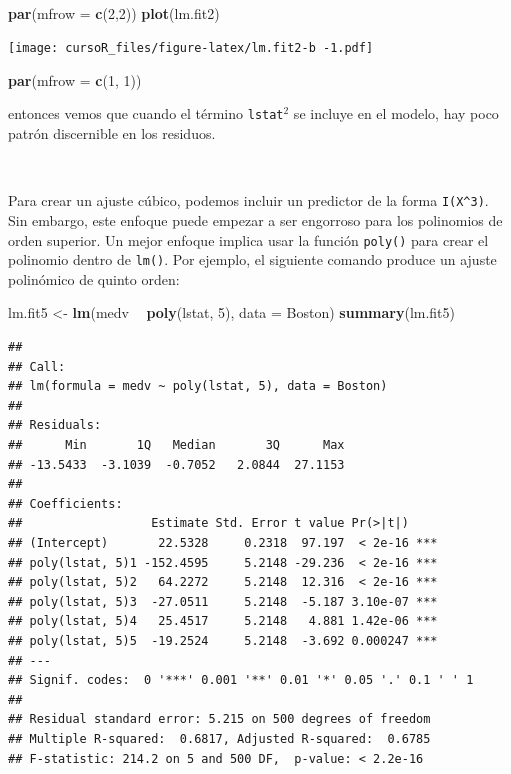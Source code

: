 \documentclass[]{book}
\newenvironment{Shaded}{\begin{snugshade}}{\end{snugshade}}
\newcommand{\KeywordTok}[1]{\textcolor[rgb]{0.13,0.29,0.53}{\textbf{#1}}}
\newcommand{\DataTypeTok}[1]{\textcolor[rgb]{0.13,0.29,0.53}{#1}}
\newcommand{\DecValTok}[1]{\textcolor[rgb]{0.00,0.00,0.81}{#1}}
\newcommand{\StringTok}[1]{\textcolor[rgb]{0.31,0.60,0.02}{#1}}
\newcommand{\OperatorTok}[1]{\textcolor[rgb]{0.81,0.36,0.00}{\textbf{#1}}}
\newcommand{\NormalTok}[1]{#1}
\begin{document}
~

\begin{Shaded}
\begin{Highlighting}[]
\KeywordTok{par}\NormalTok{(}\DataTypeTok{mfrow =} \KeywordTok{c}\NormalTok{(}\DecValTok{2}\NormalTok{,}\DecValTok{2}\NormalTok{))}
\KeywordTok{plot}\NormalTok{(lm.fit2)}
\end{Highlighting}
\end{Shaded}

\texttt{[image: cursoR\_files/figure-latex/lm.fit2-b -1.pdf]}

\begin{Shaded}
\begin{Highlighting}[]
\KeywordTok{par}\NormalTok{(}\DataTypeTok{mfrow =} \KeywordTok{c}\NormalTok{(}\DecValTok{1}\NormalTok{, }\DecValTok{1}\NormalTok{))}
\end{Highlighting}
\end{Shaded}

entonces vemos que cuando el término \texttt{lstat}\(^2\) se incluye en
el modelo, hay poco patrón discernible en los residuos.

~

Para crear un ajuste cúbico, podemos incluir un predictor de la forma
\texttt{I(X\^{}3)}. Sin embargo, este enfoque puede empezar a ser
engorroso para los polinomios de orden superior. Un mejor enfoque
implica usar la función \texttt{poly()} para crear el polinomio dentro
de \texttt{lm()}. Por ejemplo, el siguiente comando produce un ajuste
polinómico de quinto orden:

\begin{Shaded}
\begin{Highlighting}[]
\NormalTok{lm.fit5 <-}\StringTok{ }\KeywordTok{lm}\NormalTok{(medv }\OperatorTok{~}\StringTok{ }\KeywordTok{poly}\NormalTok{(lstat, }\DecValTok{5}\NormalTok{), }\DataTypeTok{data =}\NormalTok{ Boston)}
\KeywordTok{summary}\NormalTok{(lm.fit5)}
\end{Highlighting}
\end{Shaded}

\begin{verbatim}
## 
## Call:
## lm(formula = medv ~ poly(lstat, 5), data = Boston)
## 
## Residuals:
##      Min       1Q   Median       3Q      Max 
## -13.5433  -3.1039  -0.7052   2.0844  27.1153 
## 
## Coefficients:
##                  Estimate Std. Error t value Pr(>|t|)    
## (Intercept)       22.5328     0.2318  97.197  < 2e-16 ***
## poly(lstat, 5)1 -152.4595     5.2148 -29.236  < 2e-16 ***
## poly(lstat, 5)2   64.2272     5.2148  12.316  < 2e-16 ***
## poly(lstat, 5)3  -27.0511     5.2148  -5.187 3.10e-07 ***
## poly(lstat, 5)4   25.4517     5.2148   4.881 1.42e-06 ***
## poly(lstat, 5)5  -19.2524     5.2148  -3.692 0.000247 ***
## ---
## Signif. codes:  0 '***' 0.001 '**' 0.01 '*' 0.05 '.' 0.1 ' ' 1
## 
## Residual standard error: 5.215 on 500 degrees of freedom
## Multiple R-squared:  0.6817, Adjusted R-squared:  0.6785 
## F-statistic: 214.2 on 5 and 500 DF,  p-value: < 2.2e-16
\end{verbatim}
\end{document}
